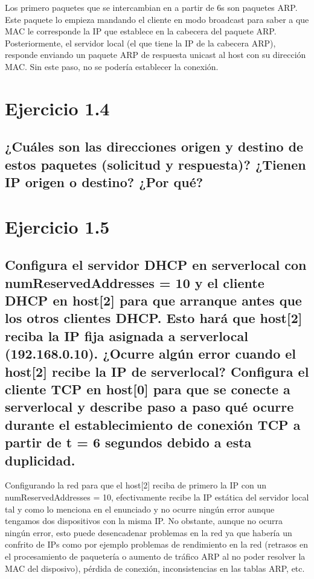 Los primero paquetes que se intercambian en a partir de 6s son paquetes ARP. Este paquete lo empieza mandando el cliente en modo broadcast para saber a que MAC le corresponde la IP que establece en la cabecera del paquete ARP. Posteriormente, el servidor local (el que tiene la IP de la cabecera ARP), responde enviando un paquete ARP de respuesta unicast al host con su dirección MAC. Sin este paso, no se podería establecer la conexión.

\section{Ejercicio 1.4}

\subsection{¿Cuáles son las direcciones origen y destino de estos paquetes (solicitud y respuesta)? ¿Tienen IP origen o destino? ¿Por qué?}

\section{Ejercicio 1.5}

\subsection{Configura el servidor DHCP en serverlocal con numReservedAddresses = 10 y el cliente DHCP en host[2]
para que arranque antes que los otros clientes DHCP. Esto hará que host[2] reciba la IP fija asignada a
serverlocal (192.168.0.10). ¿Ocurre algún error cuando el host[2] recibe la IP de serverlocal? Configura el
cliente TCP en host[0] para que se conecte a serverlocal y describe paso a paso qué ocurre durante el
establecimiento de conexión TCP a partir de t = 6 segundos debido a esta duplicidad.}

Configurando la red para que el host[2] reciba de primero la IP con un numReservedAddresses = 10, efectivamente recibe la IP estática del servidor local tal y como lo menciona en el enunciado y no ocurre ningún error aunque tengamos dos dispositivos con la misma IP. No obstante, aunque no ocurra ningún error, esto puede desencadenar problemas en la red ya que habería un confrito de IPs como por ejemplo problemas de rendimiento en la red (retrasos en el procesamiento de paquetería o aumento de tráfico ARP al no poder resolver la MAC del disposivo),  pérdida de conexión, inconsistencias en las tablas ARP, etc.

